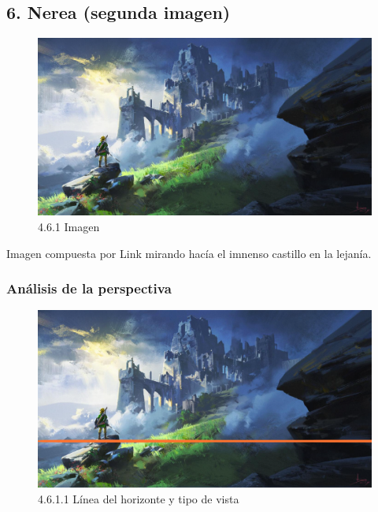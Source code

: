 \documentclass[12pt]{article}
\begin{document}

    \subsection{6. Nerea (segunda imagen)}
    \begin{figure}[H]
      \centering
      \includegraphics[width=\textwidth]{images/Nerea/6_concept_art.png}
      \caption{\small 4.6.1 Imagen}
    \end{figure}
    Imagen compuesta por Link mirando hacía el imnenso castillo en la lejanía.

    
        \subsubsection{Análisis de la perspectiva}


    \begin{figure}[H]
      \centering
      \includegraphics[width=\textwidth]{images/Nerea/Nerea Zelda concept 611.PNG}
      \caption{\small 4.6.1.1 Línea del horizonte y tipo de vista}
    \end{figure}
\end{document}
